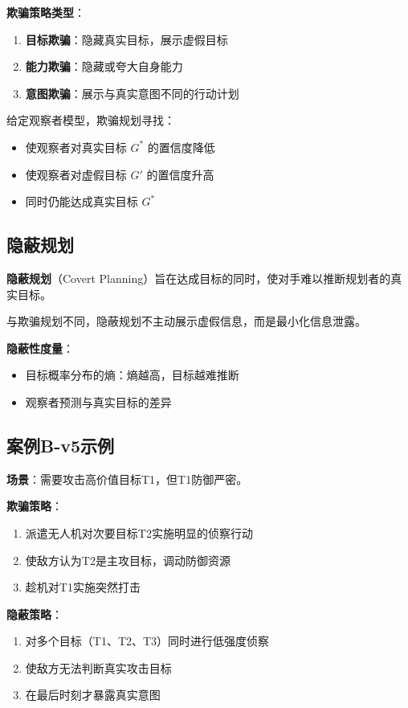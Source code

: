 \textbf{欺骗策略类型}：
\begin{enumerate}[leftmargin=2em]
  \item \textbf{目标欺骗}：隐藏真实目标，展示虚假目标
  \item \textbf{能力欺骗}：隐藏或夸大自身能力
  \item \textbf{意图欺骗}：展示与真实意图不同的行动计划
\end{enumerate}

\begin{keypoint}[欺骗规划的形式化]
给定观察者模型，欺骗规划寻找：
\begin{itemize}
  \item 使观察者对真实目标 $G^*$ 的置信度降低
  \item 使观察者对虚假目标 $G'$ 的置信度升高
  \item 同时仍能达成真实目标 $G^*$
\end{itemize}
\end{keypoint}

\subsection{隐蔽规划}

\begin{definition}[隐蔽规划]
\textbf{隐蔽规划}（Covert Planning）旨在达成目标的同时，使对手难以推断规划者的真实目标。
\end{definition}

与欺骗规划不同，隐蔽规划不主动展示虚假信息，而是最小化信息泄露。

\textbf{隐蔽性度量}：
\begin{itemize}[leftmargin=2em]
  \item 目标概率分布的熵：熵越高，目标越难推断
  \item 观察者预测与真实目标的差异
\end{itemize}

\subsection{案例B-v5示例}

\begin{example}[佯攻与主攻]
\textbf{场景}：需要攻击高价值目标T1，但T1防御严密。

\textbf{欺骗策略}：
\begin{enumerate}
  \item 派遣无人机对次要目标T2实施明显的侦察行动
  \item 使敌方认为T2是主攻目标，调动防御资源
  \item 趁机对T1实施突然打击
\end{enumerate}

\textbf{隐蔽策略}：
\begin{enumerate}
  \item 对多个目标（T1、T2、T3）同时进行低强度侦察
  \item 使敌方无法判断真实攻击目标
  \item 在最后时刻才暴露真实意图
\end{enumerate}
\end{example}

